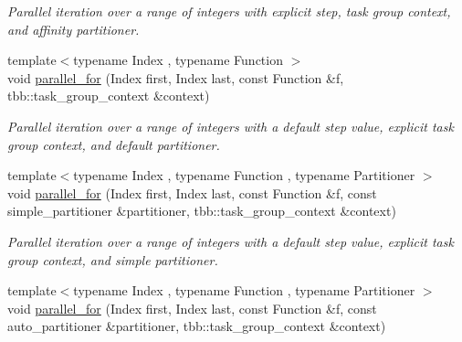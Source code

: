 \begin{DoxyCompactItemize}
\begin{DoxyCompactList}\small\item\em Parallel iteration over a range of integers with explicit step, task group context, and affinity partitioner. \end{DoxyCompactList}\item 
\hypertarget{namespacetbb_1_1strict__ppl_adb6b744e7790d3547b9aaca879a3cd56}{}{\footnotesize template$<$typename Index , typename Function $>$ }\\void \hyperlink{namespacetbb_1_1strict__ppl_adb6b744e7790d3547b9aaca879a3cd56}{parallel\+\_\+for} (Index first, Index last, const Function \&f, tbb\+::task\+\_\+group\+\_\+context \&context)\label{namespacetbb_1_1strict__ppl_adb6b744e7790d3547b9aaca879a3cd56}

\begin{DoxyCompactList}\small\item\em Parallel iteration over a range of integers with a default step value, explicit task group context, and default partitioner. \end{DoxyCompactList}\item 
\hypertarget{namespacetbb_1_1strict__ppl_a952b64b0fa2dee81ba91b16bdc288ca2}{}{\footnotesize template$<$typename Index , typename Function , typename Partitioner $>$ }\\void \hyperlink{namespacetbb_1_1strict__ppl_a952b64b0fa2dee81ba91b16bdc288ca2}{parallel\+\_\+for} (Index first, Index last, const Function \&f, const simple\+\_\+partitioner \&partitioner, tbb\+::task\+\_\+group\+\_\+context \&context)\label{namespacetbb_1_1strict__ppl_a952b64b0fa2dee81ba91b16bdc288ca2}

\begin{DoxyCompactList}\small\item\em Parallel iteration over a range of integers with a default step value, explicit task group context, and simple partitioner. \end{DoxyCompactList}\item 
\hypertarget{namespacetbb_1_1strict__ppl_a119d4bedef13739a8f2fdfb48cabd194}{}{\footnotesize template$<$typename Index , typename Function , typename Partitioner $>$ }\\void \hyperlink{namespacetbb_1_1strict__ppl_a119d4bedef13739a8f2fdfb48cabd194}{parallel\+\_\+for} (Index first, Index last, const Function \&f, const auto\+\_\+partitioner \&partitioner, tbb\+::task\+\_\+group\+\_\+context \&context)\label{namespacetbb_1_1strict__ppl_a119d4bedef13739a8f2fdfb48cabd194}


\end{DoxyCompactItemize}

